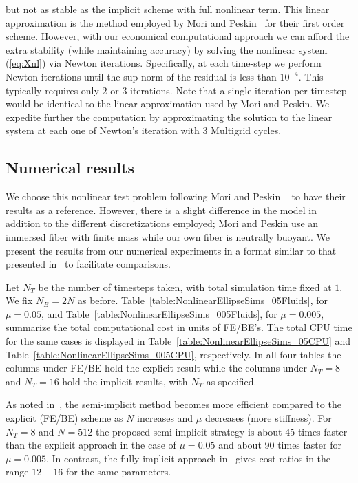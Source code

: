 \documentclass[preprint,12pt]{elsarticle}
\begin{document}
but not as stable as the implicit scheme with full nonlinear term. This linear approximation is the method employed by Mori and Peskin~\cite{MP2008} for their first order scheme. However, with our economical computational approach we can afford the extra stability (while maintaining accuracy) by solving the nonlinear system (\ref{eq:Xnl}) via Newton iterations. Specifically, at each time-step we perform Newton iterations until the sup norm of the residual is less than $10^{-4}$. This typically requires only $2$ or $3$ iterations. Note that a single iteration per timestep would be identical to the linear approximation used by Mori and Peskin. We expedite further the 
computation by approximating the solution to the linear system at each one of Newton's iteration with 3 Multigrid cycles.

\subsection{Numerical results}
We choose this nonlinear test problem following Mori and Peskin ~\cite{MP2008} to have their results as a reference. However, 
there is a  slight difference in the model in addition to the different discretizations employed; Mori and Peskin use an immersed fiber with finite mass while our own fiber is neutrally buoyant.  We present the results from our numerical experiments in a format similar to that presented in~\cite{MP2008} to facilitate comparisons.

Let $N_T$ be the number of timesteps taken, with total simulation time fixed at $1$. We fix $N_B=2N$ as before. 
Table~\ref{table:NonlinearEllipseSims_05Fluids}, for $\mu=0.05$, and Table~\ref{table:NonlinearEllipseSims_005Fluids}, 
for $\mu=0.005$,  summarize the total computational cost in units of FE/BE's. The total CPU time for the same cases is displayed in
  Table~\ref{table:NonlinearEllipseSims_05CPU} and Table~\ref{table:NonlinearEllipseSims_005CPU}, respectively.
  In all four tables the columns under FE/BE hold the explicit result while the columns under $N_T=8$ and $N_T=16$ hold the implicit results, with $N_T$ as specified. 

As noted in~\cite{MP2008}, the semi-implicit method becomes more efficient compared to the explicit (FE/BE) 
scheme as $N$ increases and $\mu$ decreases (more stiffness). For $N_T=8$ and $N=512$ the proposed semi-implicit strategy is about 45 times faster than the explicit approach in the case of $ \mu=0.05$ and about 90 times faster for $\mu=0.005$. In contrast, the fully implicit
approach in~\cite{MP2008} gives cost ratios in the range $12-16$ for the same parameters.
\end{document}

